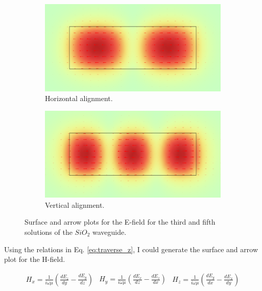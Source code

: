 \documentclass[a4paper,12pt]{article}
\begin{document}
\begin{figure}[H]
    \centering
    \begin{subfigure}{0.45\textwidth}
        \centering
        \includegraphics[scale=0.32]{SiO2_normE_3.png}
        \caption{Horizontal alignment.}
        \label{fig:third_sol}
    \end{subfigure}
    \hfill
    \begin{subfigure}{0.45\textwidth}
        \centering
        \includegraphics[scale=0.32]{SiO2_normE_5.png}
        \caption{Vertical alignment.}
        \label{fig:fifth_sol}
    \end{subfigure}
    \caption{Surface and arrow plots for the E-field for the third and fifth solutions of the $SiO_2$ waveguide.}
\end{figure}

Using the relations in Eq. \ref{eq:traverse_z}, I could generate the surface and arrow plot for the H-field. 

\begin{subequations}
    \begin{align}
        H_x = \frac{1}{i \omega \mu} \left( \frac{dE_z}{dy} - \frac{dE_y}{dz}  \right)
    \end{align}
    \begin{align}
        H_y = \frac{1}{i \omega \mu} \left( \frac{dE_x}{dz} - \frac{dE_z}{dx}  \right)
    \end{align}
    \begin{align}
        H_z = \frac{1}{i \omega \mu} \left( \frac{dE_y}{dx} - \frac{dE_x}{dy}  \right)
    \end{align}
    \label{eq:traverse_z}
\end{subequations}
\end{document}
